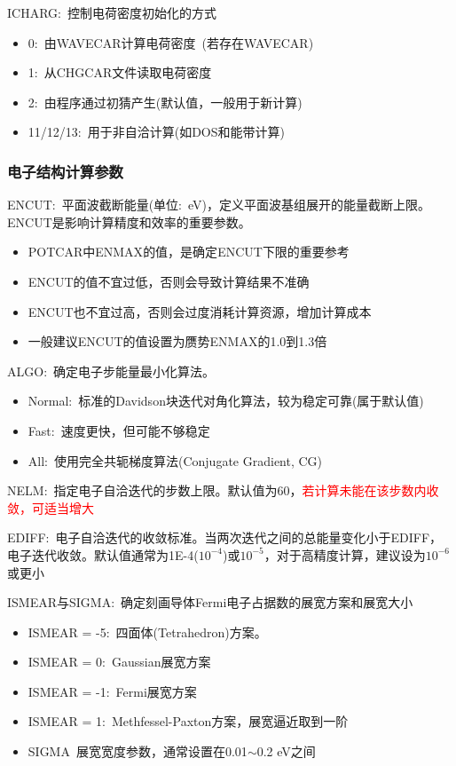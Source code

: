 \textrm{ICHARG}:~控制电荷密度初始化的方式
\begin{itemize}
	\item 0:~由\textrm{WAVECAR}计算电荷密度~(若存在\textrm{WAVECAR})
	\item 1:~从\textrm{CHGCAR}文件读取电荷密度
	\item 2:~由程序通过初猜产生(默认值，一般用于新计算)
	\item 11/12/13:~用于非自洽计算(如\textrm{DOS}和能带计算)
\end{itemize}

\subsubsection{电子结构计算参数}
\textrm{ENCUT}:~平面波截断能量(单位:~\textrm{eV})，定义平面波基组展开的能量截断上限。\textrm{ENCUT}是影响计算精度和效率的重要参数。
\begin{itemize}
	\item \textrm{POTCAR}中\textrm{ENMAX}的值，是确定\textrm{ENCUT}下限的重要参考
	\item \textrm{ENCUT}的值不宜过低，否则会导致计算结果不准确
	\item \textrm{ENCUT}也不宜过高，否则会过度消耗计算资源，增加计算成本
	\item 一般建议\textrm{ENCUT}的值设置为赝势\textrm{ENMAX}的1.0到1.3倍
\end{itemize}

\textrm{ALGO}:~确定电子步能量最小化算法。
\begin{itemize}
	\item \textrm{Normal}:~标准的\textrm{Davidson}块迭代对角化算法，较为稳定可靠(属于默认值)
	\item \textrm{Fast}:~速度更快，但可能不够稳定
	\item \textrm{All}:~使用完全共轭梯度算法\textrm{(Conjugate Gradient, CG)}
\end{itemize}

\textrm{NELM}:~指定电子自洽迭代的步数上限。默认值为60，\textcolor{red}{若计算未能在该步数内收敛，可适当增大}

\textrm{EDIFF}:~电子自洽迭代的收敛标准。当两次迭代之间的总能量变化小于\textrm{EDIFF}，电子迭代收敛。默认值通常为\textrm{1E-4($10^{-4}$)}或$10^{-5}$，对于高精度计算，建议设为$10^{-6}$或更小

\textrm{ISMEAR}与\textrm{SIGMA}:~确定刻画导体\textrm{Fermi}电子占据数的展宽方案和展宽大小
\begin{itemize}
	\item \textrm{ISMEAR = -5}:~四面体\textrm{(Tetrahedron)}方案。%
	\item \textrm{ISMEAR = 0}:~\textrm{Gaussian}展宽方案
	\item \textrm{ISMEAR = -1}:~\textrm{Fermi}展宽方案
	\item \textrm{ISMEAR = 1}:~\textrm{Methfessel-Paxton}方案，展宽逼近取到一阶%
	\item \textrm{SIGMA}~展宽宽度参数，通常设置在\textrm{0.01$\sim$0.2 eV}之间
\end{itemize}

